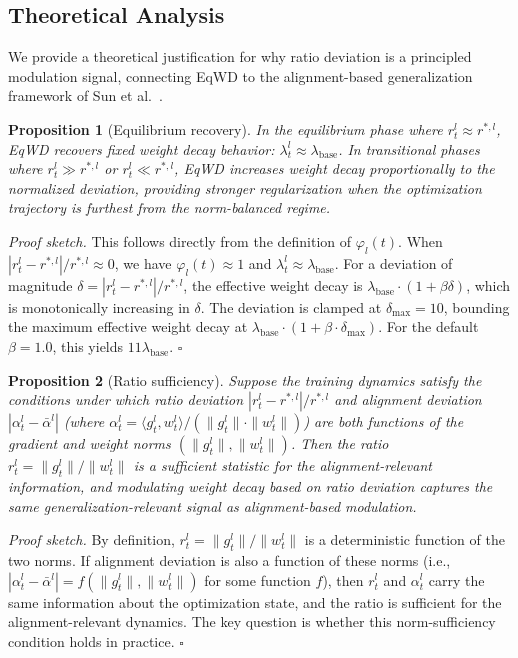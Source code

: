 \documentclass{article}
\begin{document}
\subsection{Theoretical Analysis}
\label{sec:theory}

We provide a theoretical justification for why ratio deviation is a
principled modulation signal, connecting EqWD to the alignment-based
generalization framework of Sun et al.~\citep{sun2025cvpr}.

\textbf{Proposition 1} (Equilibrium recovery). \emph{In the equilibrium
phase where $r_t^l \approx r^{*,l}$, EqWD recovers fixed weight decay
behavior: $\lambda_t^l \approx \lambda_{\text{base}}$. In transitional
phases where $r_t^l \gg r^{*,l}$ or $r_t^l \ll r^{*,l}$, EqWD
increases weight decay proportionally to the normalized deviation,
providing stronger regularization when the optimization trajectory is
furthest from the norm-balanced regime.}

\emph{Proof sketch.} This follows directly from the definition of
$\varphi_l(t)$. When $|r_t^l - r^{*,l}| / r^{*,l} \approx 0$, we
have $\varphi_l(t) \approx 1$ and
$\lambda_t^l \approx \lambda_{\text{base}}$. For a deviation of
magnitude $\delta = |r_t^l - r^{*,l}| / r^{*,l}$, the effective weight
decay is $\lambda_{\text{base}} \cdot (1 + \beta \delta)$, which is
monotonically increasing in $\delta$. The deviation is clamped at
$\delta_{\max} = 10$, bounding the maximum effective weight decay at
$\lambda_{\text{base}} \cdot (1 + \beta \cdot \delta_{\max})$. For the
default $\beta = 1.0$, this yields $11\lambda_{\text{base}}$.
\hfill$\square$

\textbf{Proposition 2} (Ratio sufficiency). \emph{Suppose the training
dynamics satisfy the conditions under which ratio deviation
$|r_t^l - r^{*,l}| / r^{*,l}$ and alignment deviation
$|\alpha_t^l - \bar{\alpha}^l|$ (where
$\alpha_t^l = \langle g_t^l, w_t^l \rangle / (\|g_t^l\| \cdot \|w_t^l\|)$)
are both functions of the gradient and weight norms
$(\|g_t^l\|, \|w_t^l\|)$. Then the ratio
$r_t^l = \|g_t^l\| / \|w_t^l\|$ is a sufficient statistic for the
alignment-relevant information, and modulating weight decay based on
ratio deviation captures the same generalization-relevant signal as
alignment-based modulation.}

\emph{Proof sketch.} By definition, $r_t^l = \|g_t^l\| / \|w_t^l\|$ is
a deterministic function of the two norms. If alignment deviation is
also a function of these norms (i.e.,
$|\alpha_t^l - \bar{\alpha}^l| = f(\|g_t^l\|, \|w_t^l\|)$ for some
function $f$), then $r_t^l$ and $\alpha_t^l$ carry the same
information about the optimization state, and the ratio is sufficient
for the alignment-relevant dynamics. The key question is whether this
norm-sufficiency condition holds in practice. \hfill$\square$
\end{document}
